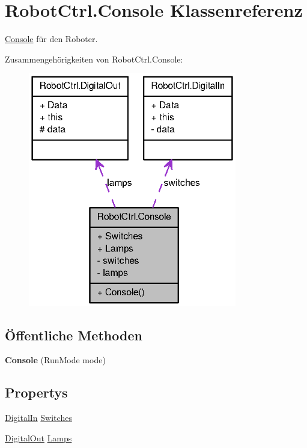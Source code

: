 \hypertarget{class_robot_ctrl_1_1_console}{
\section{RobotCtrl.Console Klassenreferenz}
\label{class_robot_ctrl_1_1_console}
}


\hyperlink{class_robot_ctrl_1_1_console}{Console} f\"{u}r den Roboter.  




Zusammengehörigkeiten von RobotCtrl.Console:\nopagebreak
\begin{figure}[H]
\begin{center}
\leavevmode
\includegraphics[width=258pt]{class_robot_ctrl_1_1_console__coll__graph}
\end{center}
\end{figure}
\subsection*{Öffentliche Methoden}
\begin{DoxyCompactItemize}
\item 
\hypertarget{class_robot_ctrl_1_1_console_a635815d24705bd6de640c1594554962e}{
{\bfseries Console} (RunMode mode)}
\label{class_robot_ctrl_1_1_console_a635815d24705bd6de640c1594554962e}

\end{DoxyCompactItemize}
\subsection*{Propertys}
\begin{DoxyCompactItemize}
\item 
\hyperlink{class_robot_ctrl_1_1_digital_in}{DigitalIn} \hyperlink{class_robot_ctrl_1_1_console_a6bda1a70d35ecd46bdf21be13745932c}{Switches}
\item 
\hyperlink{class_robot_ctrl_1_1_digital_out}{DigitalOut} \hyperlink{class_robot_ctrl_1_1_console_a8d77cea764f4a4e2c4692e5776b7ded8}{Lamps}
\end{DoxyCompactItemize}


